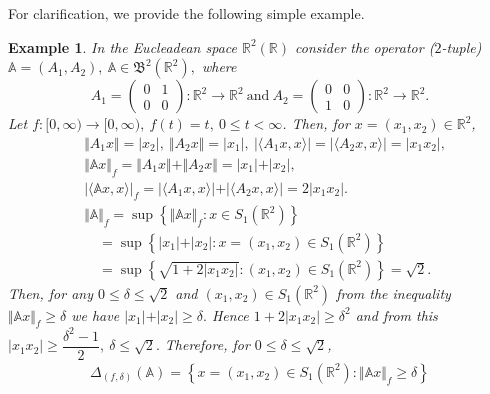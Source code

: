 \documentclass[12pt]{article}
\newtheorem{example}{Example}
\begin{document}
For clarification, we provide the following simple example.
\begin{example}
In the Eucleadean space $ \mathbb{R}^{2}(\mathbb{R}) $ consider the operator ($ 2$-tuple)
$ \mathbb{A}=(A_{1},A_{2}), \ \mathbb{A} \in \mathfrak{B}^{2}(\mathbb{R}^{2}), $
where
\[
A_{1}=\begin{pmatrix}
        0 & 1\\
        0 & 0
    \end{pmatrix} : \mathbb{R}^{2}\rightarrow \mathbb{R}^{2} \ \text{and} \
A_{2}=\begin{pmatrix}
        0 & 0\\
        1 & 0
    \end{pmatrix} : \mathbb{R}^{2}\rightarrow \mathbb{R}^{2}.
\]
Let $ f:[0,\infty )\rightarrow [0,\infty ), \ f(t)=t, \ 0\leq t <\infty$.
Then, for $ x=(x_{1},x_{2})\in \mathbb{R}^{2} $,
\begin{align*}
&\Vert A_{1}x \Vert = \vert x_{2} \vert , \  \Vert A_{2}x \Vert = \vert x_{1} \vert, \  \vert \langle A_{1}x,x \rangle \vert = \vert \langle A_{2}x,x \rangle \vert = \vert x_{1}x_{2} \vert,\\
&\Vert \mathbb{A} x \Vert_{f}= \Vert A_{1}x \Vert + \Vert A_{2}x \Vert = \vert x_{1} \vert + \vert x_{2} \vert ,\\
&
\vert \langle \mathbb{A} x,x  \rangle \vert_{f} = \vert \langle A_{1}x,x \rangle \vert + \vert \langle A_{2}x,x \rangle \vert =2 \vert x_{1}x_{2} \vert .
\\
& \Vert \mathbb{A} \Vert_{f} = \sup\left\lbrace \Vert \mathbb{A}x \Vert_{f}: x \in S_{1}(\mathbb{R}^{2}) \right\rbrace  \\
&\quad = \sup \left\lbrace \vert x_{1} \vert + \vert x_{2} \vert : x=(x_{1},x_{2})\in S_{1}(\mathbb{R}^{2}) \right\rbrace  \\
&\quad = \sup \left\lbrace \sqrt{1+2\vert x_{1}x_{2} \vert}: (x_{1},x_{2})\in S_{1}(\mathbb{R}^{2}) \right\rbrace = \sqrt{2}.
\end{align*}
Then, for any $ 0\leq \delta \leq \sqrt{2} $ and $ (x_{1},x_{2}) \in S_{1}(\mathbb{R}^{2})$ from the inequality $ \Vert \mathbb{A}x \Vert_{f}\geq \delta $ we have $ \vert x_{1} \vert + \vert x_{2} \vert \geq \delta . $ Hence $ 1+2\vert x_{1}x_{2} \vert  \geq \delta^{2} $ and from this $ \vert x_{1}x_{2} \vert \geq \dfrac{\delta^{2}-1}{2}, \ \delta\leq \sqrt{2}. $
Therefore, for $ 0\leq \delta \leq \sqrt{2} $,
\begin{multline*}
\Delta_{(f,\delta)}(\mathbb{A})  =  \left\lbrace x=(x_{1},x_{2})\in S_{1}(\mathbb{R}^{2}) : \Vert \mathbb{A} x \Vert_{f}\geq \delta  \right\rbrace \\

\end{multline*}
\end{example}
\end{document}
